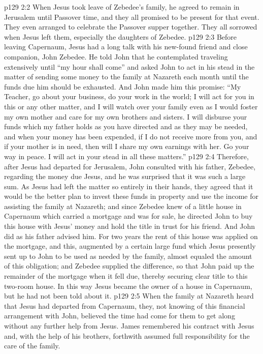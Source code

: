 \vs p129 2:2 When Jesus took leave of Zebedee’s family, he agreed to remain in Jerusalem until Passover time, and they all promised to be present for that event. They even arranged to celebrate the Passover supper together. They all sorrowed when Jesus left them, especially the daughters of Zebedee.
\pc \vs p129 2:3 Before leaving Capernaum, Jesus had a long talk with his new\hyp{}found friend and close companion, John Zebedee. He told John that he contemplated traveling extensively until \textcolor{ubdarkred}{“my hour shall come”} and asked John to act in his stead in the matter of sending some money to the family at Nazareth each month until the funds due him should be exhausted. And John made him this promise: “My Teacher, go about your business, do your work in the world; I will act for you in this or any other matter, and I will watch over your family even as I would foster my own mother and care for my own brothers and sisters. I will disburse your funds which my father holds as you have directed and as they may be needed, and when your money has been expended, if I do not receive more from you, and if your mother is in need, then will I share my own earnings with her. Go your way in peace. I will act in your stead in all these matters.”
\vs p129 2:4 Therefore, after Jesus had departed for Jerusalem, John consulted with his father, Zebedee, regarding the money due Jesus, and he was surprised that it was such a large sum. As Jesus had left the matter so entirely in their hands, they agreed that it would be the better plan to invest these funds in property and use the income for assisting the family at Nazareth; and since Zebedee knew of a little house in Capernaum which carried a mortgage and was for sale, he directed John to buy this house with Jesus’ money and hold the title in trust for his friend. And John did as his father advised him. For two years the rent of this house was applied on the mortgage, and this, augmented by a certain large fund which Jesus presently sent up to John to be used as needed by the family, almost equaled the amount of this obligation; and Zebedee supplied the difference, so that John paid up the remainder of the mortgage when it fell due, thereby securing clear title to this two\hyp{}room house. In this way Jesus became the owner of a house in Capernaum, but he had not been told about it.
\pc \vs p129 2:5 When the family at Nazareth heard that Jesus had departed from Capernaum, they, not knowing of this financial arrangement with John, believed the time had come for them to get along without any further help from Jesus. James remembered his contract with Jesus and, with the help of his brothers, forthwith assumed full responsibility for the care of the family.
